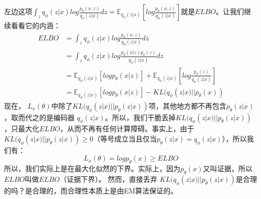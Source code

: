 \documentclass[final]{ws-ijseke}
\begin{document}
左边这项$\int_z q_\phi(z|x)log\frac{p_\theta(x,z)}{q_\phi(z|x)}dz = \mathbb{E}_{q_\phi (z|x)}[log\frac{p_\theta(x,z)}{q_\phi(z|x)}]$就是$ELBO$。让我们继续看看它的内涵：
 \begin{align*}
ELBO &= \int_zq_\phi(z|x)log\frac{p_\theta(x,z)}{q_\phi(z|x)}dz \\ &= \int_zq_\phi(z|x)log\frac{p_\theta(x|z)p_\theta(z)}{q_\phi(z|x)}dz \\ &=
\mathbb{E}_{q_\phi (z|x)}[logp_\theta(x|z)] + \mathbb{E}_{q_\phi (z|x)}[log\frac{p_\theta(z)}{q_\phi(z|x)}] \\ &=
\mathbb{E}_{q_\phi (z|x)}[logp_\theta(x|z)] - KL(q_\phi(z|x)||p_\theta(x))
\end{align*}
\hspace*{2em} 现在， $L_x(\theta)$中除了$KL(q_\phi(z|x)||p_\theta(z|x))$项，其他地方都不再包含$p_\theta(z|x)$ ，取而代之的是编码器
$q_\phi(z|x)$。所以，我们干脆丢掉$KL(q_\phi(z|x)||p_\theta(z|x))$，只最大化$ELBO$，从而不再有任何计算障碍。事实上，由于
 $KL(q_\phi(z|x)||p_\theta(z|x)) \ge 0$（等号成立当且仅当$p_\theta(z|x) = q_\phi(z|x)$），所以我们有：
 \begin{equation*}
L_x(\theta) = logp_\theta(x) \ge ELBO
\end{equation*}
\hspace*{2em} 所以，我们实际上是在最大化似然的下界。实际上，因为$p_\theta(x)$又叫证据，所以$ELBO$叫做$ELBO$（证据下界）。
然而，直接丢弃 $KL(q_\phi(z|x)||p_\theta(z|x))$是合理的吗？是合理的，而合理性本质上是由EM算法保证的。
\end{document}
